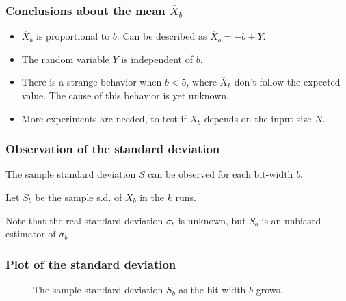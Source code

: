 \documentclass[serif, 12pt]{beamer}
\begin{document}
\begin{frame}

\frametitle{Conclusions about the mean $\overline X_b$}

\begin{itemize}

\item $\overline X_b$ is proportional to $b$. Can be described as $\overline X_b 
= -b + Y$.

\item The random variable $Y$ is independent of $b$.

\item There is a strange behavior when $b<5$, where $\overline X_b$ don't follow 
the expected value. The cause of this behavior is yet unknown.

\item More experiments are needed, to test if $X_b$ depends on the input size 
$N$.

\end{itemize}

\end{frame}


\begin{frame}

\frametitle{Observation of the standard deviation}

The sample standard deviation $S$ can be observed for each bit-width $b$.

\vspace{1em}

Let $S_b$ be the sample s.d. of $X_b$ in the $k$ runs.

\vspace{1em}

Note that the real standard deviation $\sigma_b$ is unknown, but $S_b$ is an 
unbiased estimator of $\sigma_b$

\end{frame}


\begin{frame}

\frametitle{Plot of the standard deviation}

\begin{figure}[h]
	\caption{The sample standard deviation $S_b$ as the bit-width $b$ grows.}
	\label{fig:errhh}
\end{figure}

\end{frame}
\end{document}
